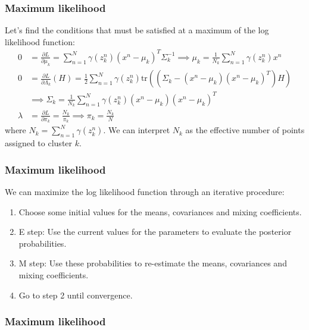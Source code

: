 \documentclass{beamer}
\begin{document}
\begin{frame}
    \frametitle{Maximum likelihood}
    Let's find the conditions that must be satisfied at a maximum of the log likelihood function:
    \begin{align*}
        0&=\frac{\partial{}L}{\partial\mu_{k}}=\sum_{n=1}^{N}\gamma(z^{n}_{k})(x^{n}-\mu_{k})^{T}\Sigma_{k}^{-1}\implies\mu_{k}=\frac{1}{N_{k}}\sum_{n=1}^{N}\gamma(z^{n}_{k})x^{n} \\
        0&=\frac{\partial{}L}{\partial\Lambda_{k}}(H)=\frac{1}{2}\sum_{n=1}^{N}\gamma(z^{n}_{k})\mathrm{tr}((\Sigma_{k}-(x^{n}-\mu_{k})(x^{n}-\mu_{k})^{T})H) \\
        &\implies\Sigma_{k}=\frac{1}{N_{k}}\sum_{n=1}^{N}\gamma(z^{n}_{k})(x^{n}-\mu_{k})(x^{n}-\mu_{k})^{T} \\
        \lambda&=\frac{\partial{}L}{\partial\pi_{k}}=\frac{N_{k}}{\pi_{k}}\implies\pi_{k}=\frac{N_{k}}{N}
    \end{align*}
    where $N_{k}=\sum_{n=1}^{N}\gamma(z^{n}_{k})$. We can interpret $N_{k}$ as the effective number of points assigned to cluster $k$.
\end{frame}

\begin{frame}
    \frametitle{Maximum likelihood}
    We can maximize the log likelihood function through an iterative procedure:
    \begin{enumerate}
        \item Choose some initial values for the means, covariances and mixing coefficients.
        \item E step: Use the current values for the parameters to evaluate the posterior probabilities.
        \item M step: Use these probabilities to re-estimate the means, covariances and mixing coefficients.
        \item Go to step 2 until convergence.
    \end{enumerate}
\end{frame}

\begin{frame}
    \frametitle{Maximum likelihood}
\end{frame}
\end{document}
